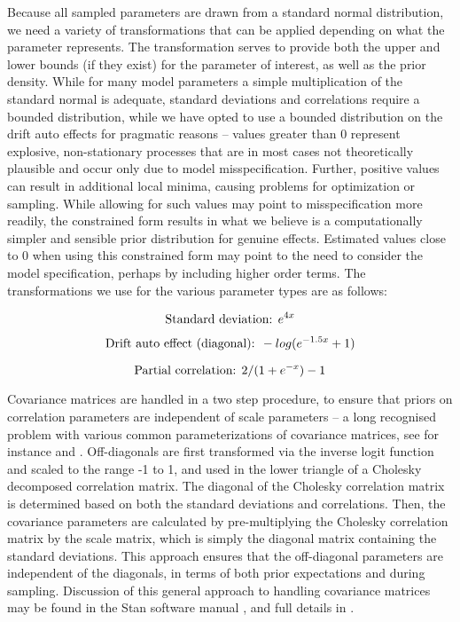 \documentclass[nojss]{jss}\usepackage[]{graphicx}\usepackage[]{color}
\begin{document}
Because all sampled parameters are drawn from a standard normal distribution, we need a variety of transformations that can be applied depending on what the parameter represents. The transformation serves to provide both the upper and lower bounds (if they exist) for the parameter of interest, as well as the prior density. While for many model parameters a simple multiplication of the standard normal is adequate, standard deviations and correlations require a bounded distribution, while we have opted to use a bounded distribution on the drift auto effects for pragmatic reasons -- values greater than 0 represent explosive, non-stationary processes that are in most cases not theoretically plausible and occur only due to model misspecification. Further, positive values can result in additional local minima, causing problems for optimization or sampling. While allowing for such values may point to misspecification more readily, the constrained form results in what we believe is a computationally simpler and sensible prior distribution for genuine effects. Estimated values close to 0 when using this constrained form may point to the need to consider the model specification, perhaps by including higher order terms. The transformations we use for the various parameter types are as follows:

\begin{equation}
\text{Standard deviation: } \mathnormal{e}^{4x} 
\end{equation}

\begin{equation}
 \text{Drift auto effect (diagonal): } -\mathnormal{log} (\mathnormal{e}^{-1.5x}+1)
\end{equation}

\begin{equation}
 \text{Partial correlation: } 2/(1+\mathnormal{e}^{-x})-1
\end{equation}

Covariance matrices are handled in a two step procedure, to ensure that priors on correlation parameters are independent of scale parameters -- a long recognised problem with various common parameterizations of covariance matrices, see for instance \citet{huang2013Simple} and \citet{gelman2006Prior}. Off-diagonals are first transformed via the inverse logit function and scaled to the range -1 to 1, and used in the lower triangle of a Cholesky decomposed correlation matrix. The diagonal of the Cholesky correlation matrix is determined based on both the standard deviations and correlations. Then, the covariance parameters are calculated by pre-multiplying the Cholesky correlation matrix by the scale matrix, which is simply the diagonal matrix containing the standard deviations. This approach ensures that the off-diagonal parameters are independent of the diagonals, in terms of both prior expectations and during sampling. Discussion of this general approach to handling covariance matrices may be found in the Stan software manual \citep{standevelopmentteam2016stan}, and full details in \cite{lewandowski2009generating}. 
\end{document}
